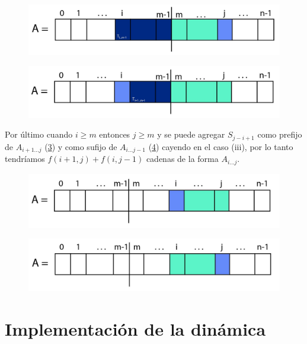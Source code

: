 \documentclass[a4paper]{article}
\begin{document}
    \begin{figure}[h!]
    	\centering
    	\includegraphics[width=0.7\linewidth]{ppp5a}
    	\caption{}
    	\label{fig:ppp5a}
    \end{figure}

	\begin{figure}[h!]
		\centering
		\includegraphics[width=0.7\linewidth]{ppp5}
		\caption{}
		\label{fig:ppp5}
	\end{figure}
    
    
    Por \'ultimo cuando $i \geq m$ entonces $j \geq m$ y se puede agregar $S_{j-i+1}$ como prefijo de 
    $A_{i+1...j}$ (\ref{fig:ppp6}) y como sufijo de $A_{i...j-1}$ (\ref{fig:ppp7}) cayendo en el caso (iii), por lo tanto tendr\'iamos $f(i+1,j) + f(i,j-1)$ cadenas de la forma $A_{i...j}$.
    
    \begin{figure}[h!]
    	\centering
    	\includegraphics[width=0.7\linewidth]{ppp6}
    	\caption{}
    	\label{fig:ppp6}
    \end{figure}
    \begin{figure}[h!]
    	\centering
    	\includegraphics[width=0.7\linewidth]{ppp7}
    	\caption{}
    	\label{fig:ppp7}
    \end{figure}

\section*{Implementación de la dinámica}
    
\end{document}
